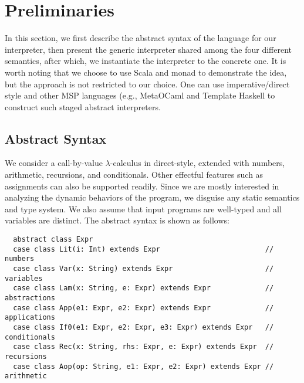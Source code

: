 \newcommand{\TLang}{$L_\lambda$}

\section{Preliminaries} \label{prelim}

In this section, we first describe the abstract syntax of the language for our interpreter, 
then present the generic interpreter shared among the four different
semantics, after which, we instantiate the interpreter to the concrete one.
It is worth noting that we choose to use Scala and monad to demonstrate the
idea, but the approach is not restricted to our choice. One can use
imperative/direct style and other MSP languages (e.g., MetaOCaml
\cite{DBLP:conf/gpce/CalcagnoTHL03, DBLP:conf/flops/Kiselyov14} and Template
Haskell \cite{Sheard:2002:TMH:636517.636528} to construct such staged abstract
interpreters.

\iffalse
Then we
will proceed in two directions: by staging it we obtain a staged concrete interpreter
(Section~\ref{stagedinterp}); by abstracting it we obtain an unstaged abstract
interpreter (Section~\ref{unstaged_abs}).
\fi

\subsection{Abstract Syntax} \label{bg_lang}

We consider a call-by-value $\lambda$-calculus in direct-style, extended
with numbers, arithmetic, recursions, and conditionals. Other effectful features
such as assignments can also be supported readily.
Since we are mostly interested in analyzing the dynamic behaviors of the
program, we disguise any static semantics and type system. We also assume that
input programs are well-typed and all variables are distinct. The abstract
syntax is shown as follows:

\begin{lstlisting}
  abstract class Expr
  case class Lit(i: Int) extends Expr                         // numbers
  case class Var(x: String) extends Expr                      // variables
  case class Lam(x: String, e: Expr) extends Expr             // abstractions
  case class App(e1: Expr, e2: Expr) extends Expr             // applications
  case class If0(e1: Expr, e2: Expr, e3: Expr) extends Expr   // conditionals
  case class Rec(x: String, rhs: Expr, e: Expr) extends Expr  // recursions
  case class Aop(op: String, e1: Expr, e2: Expr) extends Expr // arithmetic
\end{lstlisting}

